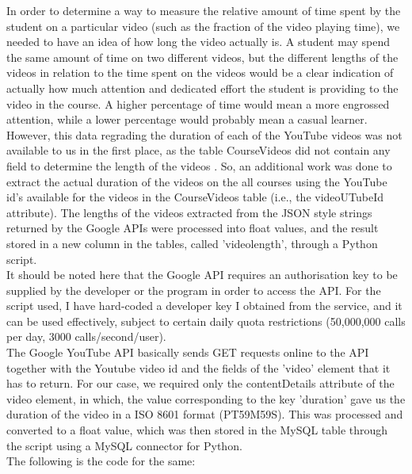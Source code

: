 \documentclass[16pt]{report}
\begin{document}
In order to determine a way to measure the relative amount of time spent by the student on a particular video (such as the fraction of the video playing time), we needed to have an idea of how long the video actually is. A student may spend the same amount of time on two different videos, but the different lengths of the videos in relation to the time spent on the videos would be a clear indication of actually how much attention and dedicated effort the student is providing to the video in the course. A higher percentage of time would mean a more engrossed attention, while a lower percentage would probably mean a casual learner.\\

However, this data regrading the duration of each of the YouTube videos was not available to us in the first place, as the table CourseVideos did not contain any field to determine the length of the videos . So, an additional work was done to extract the actual duration of the videos on the all courses using the YouTube id's available for the videos in the CourseVideos table (i.e., the videoUTubeId attribute). The lengths of the videos extracted from the JSON style strings returned by the Google APIs were processed into float values, and the result stored in a new column in the tables, called 'videolength', through a Python script.\\

It should be noted here that the Google API requires an authorisation key to be supplied by the developer or the program in order to access the API. For the script used, I have hard-coded a developer key I obtained from the service, and it can be used effectively, subject to certain daily quota restrictions (50,000,000 calls per day, 3000 calls/second/user).\\

The Google YouTube API basically sends GET requests online to the API together with the Youtube video id and the fields of the 'video' element that it has to return. For our case, we required only the contentDetails attribute of the video element, in which, the value corresponding to the key 'duration' gave us the duration of the video in a ISO 8601 format (PT59M59S). This was processed and converted to a float value, which was then stored in the MySQL table through the script using a MySQL connector for Python.\\

The following is the code for the same:\\
\end{document}
